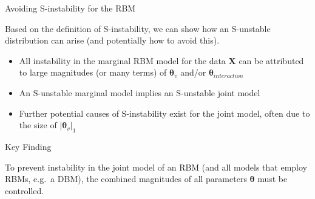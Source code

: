 \documentclass[ignorenonframetext,]{beamer}
\providecommand{\tightlist}{%
  \setlength{\itemsep}{0pt}\setlength{\parskip}{0pt}}
\theoremstyle{definition}
\begin{document}
\begin{frame}{Avoiding S-instability for the RBM}
\protect\hypertarget{avoiding-s-instability-for-the-rbm}{}

Based on the definition of S-instability, we can show how an S-unstable
distribution can arise (and potentially how to avoid this).

\begin{itemize}
\tightlist
\item
  All instability in the marginal RBM model for the data
  \(\boldsymbol X\) can be attributed to large magnitudes (or many
  terms) of \(\boldsymbol \theta_{v}\) and/or
  \(\boldsymbol \theta_{interaction}\)
\item
  An S-unstable marginal model implies an S-unstable joint model
\item
  Further potential causes of S-instability exist for the joint model,
  often due to the size of \(|\boldsymbol \theta_{v}|_1\)
\end{itemize}

\begin{block}{Key Finding}

To prevent instability in the joint model of an RBM (and all models that
employ RBMs, e.g.~a DBM), the combined magnitudes of all parameters
\(\boldsymbol \theta\) must be controlled.

\end{block}

\end{frame}
\end{document}
